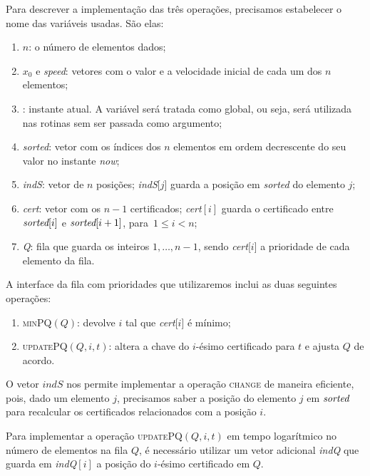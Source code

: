 Para descrever a implementação das três operações, precisamos
estabelecer o nome das variáveis usadas. São elas:
\begin{enumerate}
    \item $n$: o número de elementos dados;
    \item $x_0$ e \textit{speed}: vetores com o valor e a velocidade
    inicial de cada um dos $n$ elementos;
    \item \now: instante atual. A variável \now será tratada como
    global, ou seja, será utilizada nas rotinas sem ser passada como
    argumento;
    \item \textit{sorted}: vetor com os índices dos $n$ elementos em
    ordem decrescente do seu valor no instante \textit{now};
    \item \textit{indS}: vetor de $n$ posições; \textit{indS}[$j$]
    guarda a posição em \textit{sorted} do elemento $j$;
    \item \textit{cert}: vetor com os $n-1$ certificados;
    \textit{cert}$[i]$ guarda o certificado entre $\textit{sorted}[i]$ e
    ${\textit{sorted}[i+1]}$, para~$1\leq i < n$;
    \item \textit{Q}: fila que guarda os inteiros $1, \dots, n-1$,
    sendo \textit{cert}[$i$] a prioridade de cada elemento da fila.
\end{enumerate}

A interface da fila com prioridades que utilizaremos inclui as duas
seguintes operações:
\begin{enumerate}
    \item \textsc{minPQ}$(Q)$: devolve $i$ tal que
    \textit{cert}[$i$] é mínimo;
    \item \textsc{updatePQ}$(Q, i, t)$: altera a chave do
    $i$-ésimo certificado para $t$ e ajusta $Q$ de acordo.
\end{enumerate}

O vetor $\textit{indS}$ nos permite implementar a operação
\textsc{change} de maneira eficiente, pois, dado um elemento $j$,
precisamos saber a posição do elemento $j$ em $\textit{sorted}$ para
recalcular os certificados relacionados com a posição $i$.

Para implementar a operação \textsc{updatePQ}$(Q, i, t)$ em tempo
logarítmico no número de elementos na fila $Q$, é necessário
utilizar um vetor adicional \textit{indQ} que guarda em
\textit{indQ}$[i]$ a posição do $i$-ésimo certificado em $Q$.

